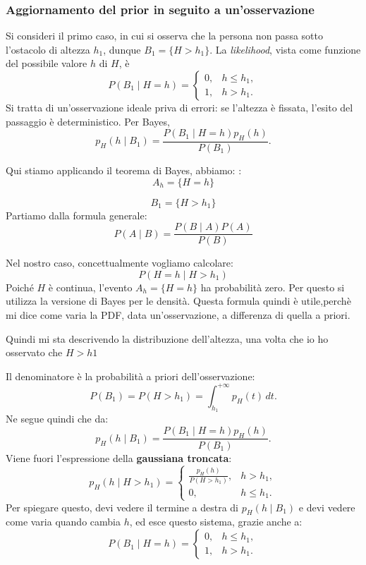 \subsubsection{Aggiornamento del prior in seguito a un'osservazione}
Si consideri il primo caso, in cui si osserva che la persona non passa sotto l'ostacolo di altezza $h_1$, dunque $B_1=\{H>h_1\}$. La \emph{likelihood}, vista come funzione del possibile valore $h$ di $H$, è
\[
P(B_1\mid H=h)=
\begin{cases}
0,&h\leq h_1,\\
1,&h>h_1.
\end{cases}
\]
Si tratta di un'osservazione ideale priva di errori: se l'altezza è fissata, l'esito del passaggio è deterministico. Per Bayes,
\[
p_H(h\mid B_1)
=\frac{P(B_1\mid H=h)p_H(h)}{P(B_1)}.
\]
\begin{observation}{ }
    Qui stiamo applicando il teorema di Bayes, abbiamo:
    :
    \[
    \boxed{A_h=\{H=h\}}
    \]

    \[
    \boxed{B_1=\{H>h_1\}}
    \]
    Partiamo dalla formula generale:
\[
P(A\mid B)=\frac{P(B\mid A)P(A)}{P(B)}
\]

Nel nostro caso, concettualmente vogliamo calcolare:
\[
P(H=h\mid H>h_1)
\]
Poiché \(H\) è continua, l'evento \(A_h=\{H=h\}\) ha probabilità zero. Per questo si utilizza la versione di Bayes per le densità.
Questa formula quindi è utile,perchè mi dice come varia la PDF, data un'osservazione, a differenza di quella a priori.
\begin{center}
    Quindi mi sta descrivendo la distribuzione dell'altezza, una volta che io ho osservato che $H > h1$
\end{center}
\end{observation}
Il denominatore è la probabilità a priori dell'osservazione:
\[
P(B_1)=P(H>h_1)=\int_{h_1}^{+\infty}p_H(t)\,dt.
\]
Ne segue quindi che da:
\[
p_H(h\mid B_1)
=\frac{P(B_1\mid H=h)p_H(h)}{P(B_1)}.
\]
Viene fuori l'espressione della \textbf{gaussiana troncata}:
\[
p_H(h\mid H>h_1)=
\begin{cases}
\displaystyle\frac{p_H(h)}{P(H>h_1)},&h>h_1,\\[6pt]
0,&h\leq h_1.
\end{cases}
\]
Per spiegare questo, devi vedere il termine a destra di $p_H(h\mid B_1)$ e devi vedere come varia quando cambia $h$, ed esce questo sistema, grazie anche a:
\[
P(B_1\mid H=h)=
\begin{cases}
0,&h\leq h_1,\\
1,&h>h_1.
\end{cases}
\]



